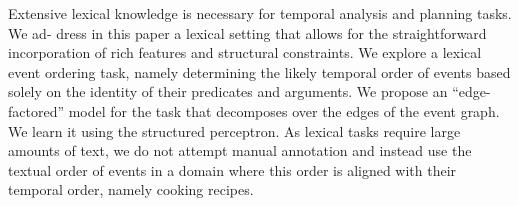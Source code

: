 Extensive lexical knowledge is necessary for temporal analysis and planning tasks. We ad- dress in this paper a lexical setting that allows for the straightforward incorporation of rich features and structural constraints. We explore a lexical event ordering task, namely determining the likely temporal order of events based solely on the identity of their predicates and arguments. We propose an ``edge-factored'' model for the task that decomposes over the edges of the event graph. We learn it using the structured perceptron. As lexical tasks require large amounts of text, we do not attempt manual annotation and instead use the textual order of events in a domain where this order is aligned with their temporal order, namely cooking recipes.
